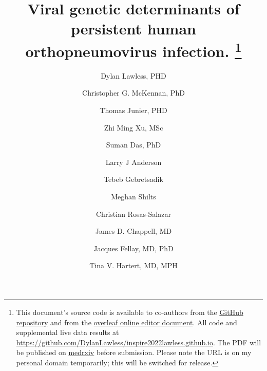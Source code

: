 \documentclass{article}
\begin{document}
\date{} %
\title{\Large \bf Viral genetic determinants of persistent human orthopneumovirus infection.
\footnote{This document's source code is available to co-authors from the 
\href{https://github.com/DylanLawless/inspire2022lawless.github.io}{GitHub repository} 
and from the 
\href{https://www.overleaf.com/project/61718a4e077acc3d20ee68f1}{overleaf online editor document}. 
All code and supplemental live data results at \href{https://github.com/DylanLawless/inspire2022lawless.github.io}{https://github.com/DylanLawless/inspire2022lawless.github.io}. 
The PDF will be published on  \href{https://www.medrxiv.org}{medrxiv} 
before submission.
Please note the URL is on my personal domain temporarily; this will be switched for release.}
}

\author[epfl]{\rm Dylan Lawless, PHD}
\author[penn]{\rm Christopher G. McKennan, PhD}
\author[sib]{\rm Thomas Junier, PHD}
\author[epfl]{\rm Zhi Ming Xu, MSc}
\author[]{\rm Suman Das, PhD}
\author[emoryPed]{\rm Larry J Anderson}
\author[bioVan]{\rm  Tebeb Gebretsadik}
\author[]{\rm Meghan Shilts}
\author[]{\rm Christian Rosas-Salazar}
\author[pedVan]{\rm James D. Chappell, MD}
\author[epfl]{\rm Jacques Fellay, MD, PhD }
\author[pedVan,medVan]{\rm Tina V. Hartert, MD, MPH}

\maketitle

\end{document}

